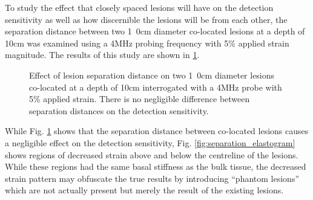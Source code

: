 			To study the effect that closely spaced lesions will have on the detection sensitivity as well as how discernible the lesions will be from each other, the separation distance between two \unit{1.0}{cm} diameter co-located lesions at a depth of \unit{10}{cm} was examined using a \unit{4}{MHz} probing frequency with \unit{5}{\%} applied strain magnitude. The results of this study are shown in \ref{fig:separation_characterization}.

			\begin{figure}[!t]
				\centering
				\caption[Co-located lesion separation distance characterization]{Effect of lesion separation distance on two \unit{1.0}{cm} diameter lesions co-located at a depth of \unit{10}{cm} interrogated with a \unit{4}{MHz} probe with \unit{5}{\%} applied strain. There is no negligible difference between separation distances on the detection sensitivity.}
				\label{fig:separation_characterization}
			\end{figure}

			While Fig. \ref{fig:separation_characterization} shows that the separation distance between co-located lesions causes a negligible effect on the detection sensitivity, Fig. \ref{fig:separation_elastogram} shows regions of decreased strain above and below the centreline of the lesions. While these regions had the same basal stiffness as the bulk tissue, the decreased strain pattern may obfuscate the true results by introducing ``phantom lesions'' which are not actually present but merely the result of the existing lesions.

